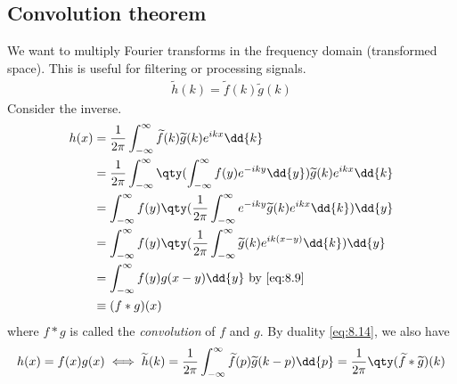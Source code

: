 \subsection{Convolution theorem}
We want to multiply Fourier transforms in the frequency domain (transformed space).
This is useful for filtering or processing signals.
\begin{align*}
	\widetilde h(k) = \widetilde f(k) \widetilde g(k)
\end{align*}
Consider the inverse.
\begin{align}
	h(x) &= \frac{1}{2\pi} \int_{-\infty}^\infty \widetilde f(k) \widetilde g(k) e^{ikx} \dd{k} \notag \\
	&= \frac{1}{2\pi} \int_{-\infty}^\infty \qty(\int_{-\infty}^\infty f(y) e^{-iky} \dd{y}) \widetilde g(k) e^{ikx} \dd{k} \notag \\
	&= \int_{-\infty}^\infty f(y) \qty( \frac{1}{2\pi} \int_{-\infty}^\infty e^{-iky} \widetilde g(k) e^{ikx} \dd{k} ) \dd{y} \notag \\
	&= \int_{-\infty}^\infty f(y) \qty( \frac{1}{2\pi} \int_{-\infty}^\infty \widetilde g(k) e^{ik(x-y)} \dd{k} ) \dd{y} \notag \\
	&= \int_{-\infty}^\infty f(y) g(x-y) \dd{y} \text{ by \cref{eq:8.9}} \notag \\
	&\equiv (f \ast g)(x) \label{eq:8.17}
\end{align}
where $f \ast g$ is called the \textit{convolution} of $f$ and $g$.
By duality \cref{eq:8.14}, we also have
\begin{align} \label{eq:8.18}
	h(x) = f(x) g(x) \iff \widetilde h(k) = \frac{1}{2\pi} \int_{-\infty}^\infty \widetilde f(p) \widetilde g(k-p) \dd{p} = \frac{1}{2\pi}\qty(\widetilde f \ast \widetilde g)(k)
\end{align}

